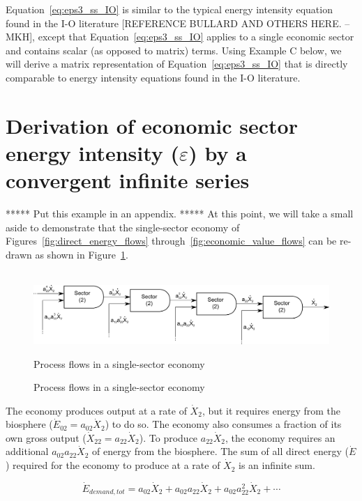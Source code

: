 Equation~\ref{eq:eps3_ss_IO} is similar 
to the typical energy intensity equation 
found in the I-O literature [REFERENCE BULLARD AND OTHERS HERE. --MKH], 
except that Equation~\ref{eq:eps3_ss_IO} applies 
to a single economic sector and contains scalar 
(as opposed to matrix) terms. 
Using Example C below, we will derive 
a matrix representation of Equation~\ref{eq:eps3_ss_IO} 
that is directly comparable 
to energy intensity equations found in the I-O literature.

\section{Derivation of economic sector energy intensity ($\varepsilon$) by a convergent infinite series}

***** Put this example in an appendix. ***** At this point, we will take a small aside 
to demonstrate that the single-sector economy 
of Figures~\ref{fig:direct_energy_flows} through~\ref{fig:economic_value_flows} 
can be re-drawn as shown in Figure~\ref{fig:single_sector_flows_3}.

\begin{figure}[h!]
\centering\
\includegraphics[width=1.0\linewidth]{Part_3/Chapter_Intensity/images/I-O_Process_Equivalence.pdf}
\caption{Process flows in a single-sector economy}{Process flows in a single-sector economy}
\label{fig:single_sector_flows_3}
\end{figure}

The economy produces output at a rate of $\dot{X}_{2}$, 
but it requires energy from the biosphere 
($\dot{E}_{02} = a_{02}\dot{X}_{2}$) to do so. 
The economy also consumes a fraction 
of its own gross output 
($\dot{X}_{22} = a_{22}\dot{X}_{2}$). 
To produce $a_{22}\dot{X}_{2}$, 
the economy requires an additional $a_{02}a_{22}\dot{X}_{2}$ 
of energy from the biosphere. 
The sum of all direct energy ($\dot{E}$) required for the economy 
to produce at a rate of $\dot{X}_{2}$ is an infinite sum.

\begin{equation} \label{eq:E_dot_demand_SS}
	\dot{E}_{demand,tot} 
	= a_{02}\dot{X}_{2} 
	+ a_{02}a_{22}\dot{X}_{2} 
	+ a_{02}a_{22}^2\dot{X}_{2} 
	+ \cdots
\end{equation}

